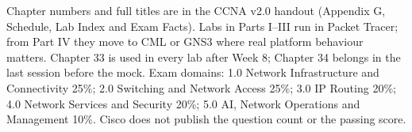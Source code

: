 \documentclass[10pt,a4paper]{article}
\begin{document}
\vspace{2pt}
{\fontsize{6.3}{7.6}\selectfont\color{neutral}%
Chapter numbers and full titles are in the CCNA v2.0 handout (Appendix G, Schedule, Lab Index and Exam Facts). Labs in Parts I--III run in Packet Tracer; from Part IV they move to CML or GNS3 where real platform behaviour matters. Chapter 33 is used in every lab after Week 8; Chapter 34 belongs in the last session before the mock.
Exam domains: 1.0 Network Infrastructure and Connectivity 25\%; 2.0 Switching and Network Access 25\%; 3.0 IP Routing 20\%; 4.0 Network Services and Security 20\%; 5.0 AI, Network Operations and Management 10\%.
Cisco does not publish the question count or the passing score.\par}
\end{document}
